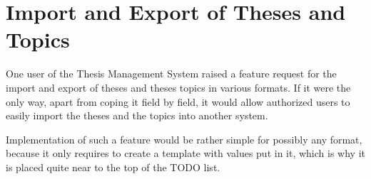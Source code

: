 \section{Import and Export of Theses and Topics}

One user of the Thesis Management System raised a feature request for the import and export of theses and theses topics in various formats. If it were the only way, apart from coping it field by field, it would allow authorized users to easily import the theses and the topics into another system.

Implementation of such a feature would be rather simple for possibly any format, because it only requires to create a template with values put in it, which is why it is placed quite near to the top of the TODO list.